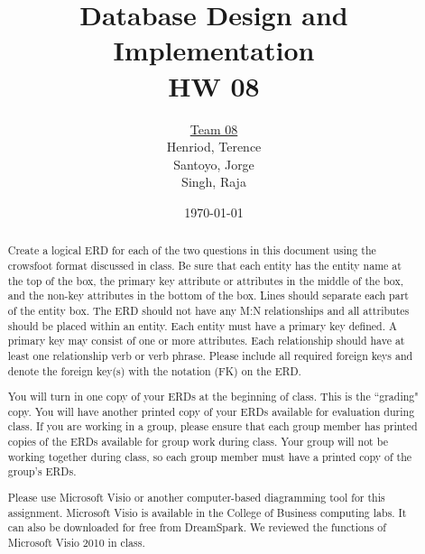 \documentclass{article}
\title{Database Design and Implementation \\ HW 08}
\author{\underline{Team 08}\\Henriod, Terence\\Santoyo, Jorge \\Singh, Raja}
\date{\today}
\begin{document}
\clearpage
\maketitle
\thispagestyle{empty} %

\begin{abstract} %
Create a logical ERD for each of the two questions in this document using the crowsfoot format discussed in class. Be sure that each entity has the entity name at the top of the box, the primary key attribute or attributes in the middle of the box, and the non-key attributes in the bottom of the box. Lines should separate each part of the entity box. The ERD should not have any M:N relationships and all attributes should be placed within an entity. Each entity must have a primary key defined. A primary key may consist of one or more attributes. Each relationship should have at least one relationship verb or verb phrase. Please include all required foreign keys and denote the foreign key(s) with the notation (FK) on the ERD.

You will turn in one copy of your ERDs at the beginning of class. This is the ``grading" copy. You will have another printed copy of your ERDs available for evaluation during class. If you are working in a group, please ensure that each group member has printed copies of the ERDs available for group work during class. Your group will not be working together during class, so each group member must have a printed copy of the group’s ERDs.

Please use Microsoft Visio or another computer-based diagramming tool for this assignment. Microsoft Visio is available in the College of Business computing labs. It can also be downloaded for free from DreamSpark. We reviewed the functions of Microsoft Visio 2010 in class.
\end{abstract}
%
%
%
\newpage
\end{document}
